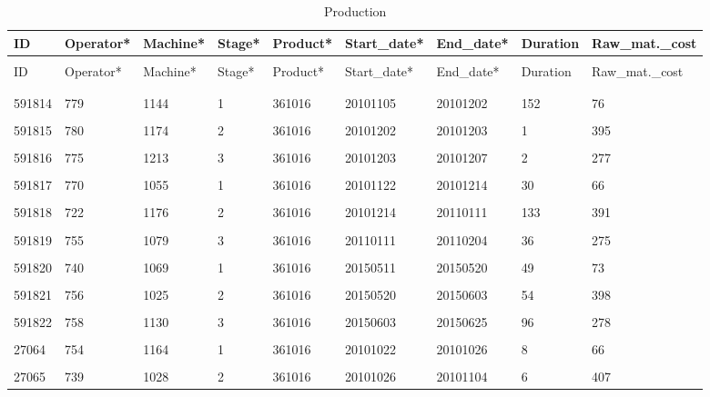 \documentclass[letterpaper,12pt]{article}
\begin{document}
\begin{longtable}{p{1cm}p{1.5cm}p{1.5cm}p{1cm}p{1.5cm}p{1.8cm}p{1.6cm}p{1.3cm}p{2.2cm}}
        \caption{Production} \\
        ID & Operator* & Machine* & Stage* & Product* & Start\_date* & End\_date* & Duration & Raw\_mat.\_cost \\
        \endfirsthead \\
        ID & Operator* & Machine* & Stage* & Product* & Start\_date* & End\_date* & Duration & Raw\_mat.\_cost \\
        \endhead \\
        \hline \\
        591814 & 779 & 1144 & 1 & \color{red} 361016 & 20101105 & 20101202 & 152 & 76 \\
        \hline \\
        591815 & 780 & 1174 & 2 & \color{red} 361016 & 20101202 & 20101203 & 1 & 395 \\
        \hline \\
        591816 & 775 & 1213 & 3 & \color{red} 361016 & 20101203 & 20101207 & 2 & 277 \\
        \hline \\
        591817 & 770 & 1055 & 1 & \color{red} 361016 & 20101122 & 20101214 & 30 & 66 \\
        \hline \\
        591818 & 722 & \color{red} 1176 & 2 & \color{red} 361016 & 20101214 & 20110111 & 133 & 391 \\
        \hline \\
        591819 & 755 & 1079 & 3 & \color{red} 361016 & 20110111 & 20110204 & 36 & 275 \\
        \hline \\
        591820 & 740 & 1069 & 1 & \color{red} 361016 & 20150511 & 20150520 & 49 & 73 \\
        \hline \\
        591821 & 756 & 1025 & 2 & \color{red} 361016 & 20150520 & 20150603 & 54 & 398 \\
        \hline \\
        591822 & 758 & 1130 & 3 & \color{red} 361016 & 20150603 & 20150625 & 96 & 278 \\
        \hline \\
        27064 & 754 & 1164 & 1 & \color{red} 361016 & 20101022 & 20101026 & 8 & 66 \\
        \hline \\
        27065 & 739 & 1028 & 2 & \color{red} 361016 & 20101026 & 20101104 & 6 & 407 \\

\end{longtable}
\end{document}
